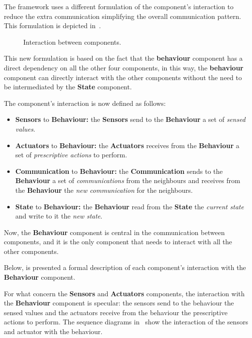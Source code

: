 The framework uses a different formulation of the component's interaction to reduce the extra communication simplifying the overall communication
pattern. This formulation is depicted in~.

\begin{figure}
	\centering
	\caption{Interaction between components.}
	\label{fig:framework-components-interaction-2}
\end{figure}

This new formulation is based on the fact that the \textbf{behaviour} component has a direct dependency on all the other four components,
in this way, the \textbf{behaviour} component can directly interact with the other components without the need to be intermediated by the
\textbf{State} component.

The component's interaction is now defined as follows:
\begin{itemize}
	\item \textbf{Sensors} to \textbf{Behaviour:} the \textbf{Sensors} send to the \textbf{Behaviour} a set of \textit{sensed values}.
	\item \textbf{Actuators} to \textbf{Behaviour:} the \textbf{Actuators} receives from the \textbf{Behaviour} a set of \textit{prescriptive
		      actions} to perform.
	\item \textbf{Communication} to \textbf{Behaviour:} the \textbf{Communication} sends to the \textbf{Behaviour} a set of \textit{communications}
	      from the neighbours and receives from the \textbf{Behaviour} the \textit{new communication} for the neighbours.
	      \item\textbf{State} to \textbf{Behaviour:} the \textbf{Behaviour} read from the \textbf{State} the \textit{current state} and write to it
	      the \textit{new state}.
\end{itemize}

Now, the \textbf{Behaviour} component is central in the communication between components, and it is the only component that needs to interact with all the other components.

Below, is presented a formal description of each component's interaction with the \textbf{Behaviour} component.

For what concern the \textbf{Sensors} and \textbf{Actuators} components, the interaction with the \textbf{Behaviour} component is specular: the
sensors send to the behaviour the sensed values and the actuators receive from the behaviour the prescriptive actions to perform.
The sequence diagrams in~ show the interaction of the sensors and actuator with the
behaviour.

